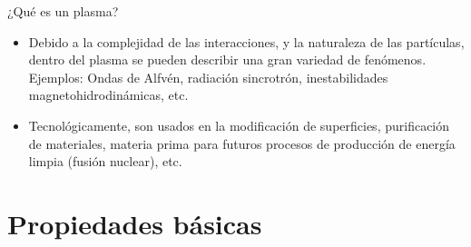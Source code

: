 \documentclass[11pt]{beamer}
\begin{document}
        \begin{frame}[t]{¿Qu\'e es un plasma?}
        \begin{itemize}
        \fontsize{11pt}{15}\selectfont
        \item<cir@1-> Debido a la complejidad de las interacciones, y la naturaleza de las partículas, dentro del plasma se pueden describir una gran variedad de fenómenos.   \\ 
        Ejemplos: Ondas de Alfvén, radiación sincrotrón, inestabilidades magnetohidrodinámicas, etc. 
        \item<cir@1-> Tecnológicamente, son usados en la modificación de superficies, purificación de materiales, materia prima para futuros procesos de producción de energía limpia (fusión nuclear), etc. 
        \end{itemize}
    
        \begin{figure}
        \centering
        {}
        {} 
        \end{figure}
    
        \end{frame}
        

    \section{Propiedades b\'asicas}
        
       
\end{document}
